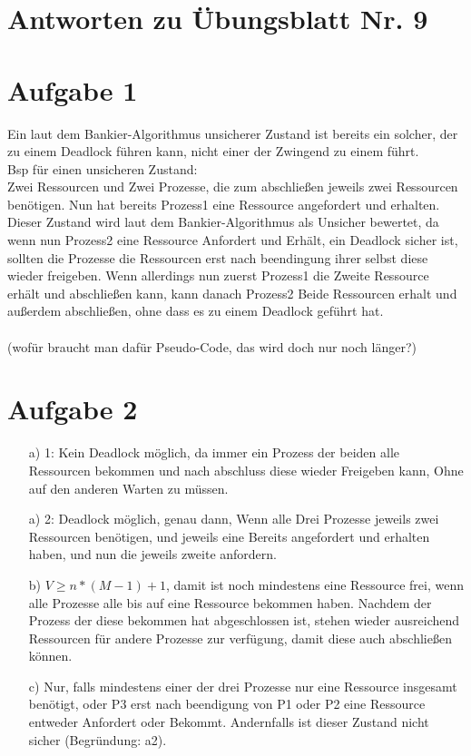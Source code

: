 \documentclass{scrartcl}
\begin{document}
\section*{Antworten zu Übungsblatt Nr. 9}

\section*{Aufgabe 1}
Ein laut dem Bankier-Algorithmus unsicherer Zustand ist bereits ein solcher,
der zu einem Deadlock führen kann, nicht einer der Zwingend zu einem führt. \\
Bsp für einen unsicheren Zustand: \\
Zwei Ressourcen und Zwei Prozesse, die zum abschließen jeweils zwei Ressourcen
benötigen. Nun hat bereits Prozess1 eine Ressource angefordert und erhalten.
Dieser Zustand wird laut dem Bankier-Algorithmus als Unsicher bewertet, da wenn
nun Prozess2 eine Ressource Anfordert und Erhält, ein Deadlock sicher ist, sollten
die Prozesse die Ressourcen erst nach beendingung ihrer selbst diese wieder freigeben.
Wenn allerdings nun zuerst Prozess1 die Zweite Ressource erhält und abschließen kann,
kann danach Prozess2 Beide Ressourcen erhalt und außerdem abschließen, ohne dass es
zu einem Deadlock geführt hat. \\ \\
(wofür braucht man dafür Pseudo-Code, das wird doch nur noch länger?)

\section*{Aufgabe 2}
\begin{itemize}
    \item[a)] 1: Kein Deadlock möglich, da immer ein Prozess der beiden alle 
        Ressourcen bekommen und nach abschluss diese wieder Freigeben kann,
        Ohne auf den anderen Warten zu müssen.
    \item[a)] 2: Deadlock möglich, genau dann, Wenn alle Drei Prozesse jeweils zwei
        Ressourcen benötigen, und jeweils eine Bereits angefordert und erhalten haben,
        und nun die jeweils zweite anfordern.
    \item[b)] $V \geq n*(M - 1) + 1$, damit ist noch mindestens eine Ressource frei,
        wenn alle Prozesse alle bis auf eine Ressource bekommen haben. Nachdem der
        Prozess der diese bekommen hat abgeschlossen ist, stehen wieder ausreichend
        Ressourcen für andere Prozesse zur verfügung, damit diese auch abschließen können.
    \item[c)] Nur, falls mindestens einer der drei Prozesse nur eine Ressource insgesamt
        benötigt, oder P3 erst nach beendigung von P1 oder P2 eine Ressource entweder
        Anfordert oder Bekommt. Andernfalls ist dieser Zustand nicht sicher
        (Begründung: a2).
\end{itemize}
\end{document}
